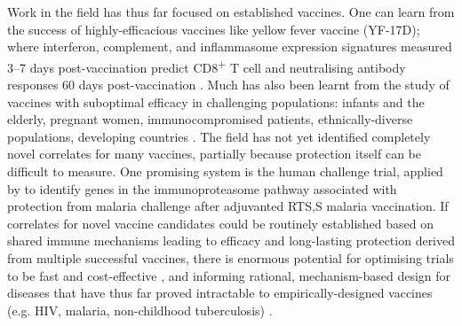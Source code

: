 Work in the field has thus far focused on established vaccines.
One can learn from the success of highly-efficacious vaccines like yellow fever vaccine (YF-17D);
where interferon, complement, and inflammasome expression signatures measured \numrange{3}{7} days post-vaccination predict CD8\textsuperscript{+} T cell and neutralising antibody responses 60 days post-vaccination \autocite{pulendran2009LearningImmunologyYellow,li2013SystemsBiologicalApproaches}.
Much has also been learnt from the study of vaccines with suboptimal efficacy in challenging populations: infants and the elderly, pregnant women, immunocompromised patients, ethnically-diverse populations, developing countries \autocite{cotugno2019OMICTechnologiesVaccine}.
The field has not yet identified completely novel correlates for many vaccines, partially because protection itself can be difficult to measure.
One promising system is the human challenge trial, applied by \textcite{vahey2010ExpressionGenesAssociated} to identify genes in the immunoproteasome pathway associated with protection from malaria challenge after adjuvanted RTS,S malaria vaccination.
If correlates for novel vaccine candidates could be routinely established based on shared immune mechanisms leading to efficacy and long-lasting protection derived from multiple successful vaccines,
there is enormous potential for optimising trials to be fast and cost-effective \autocite{pulendran2010SystemsVaccinology,blohmke2015UseSystemsBiology},
and informing rational, mechanism-based design for diseases that have thus far proved intractable to empirically-designed vaccines (e.g. HIV, malaria, non-childhood tuberculosis)
\autocite{degregorio2014EmpiricismRationalDesign,blohmke2015UseSystemsBiology,hagan2015SystemsVaccinologyEnabling,raeven2019SystemsVaccinologyBig}.

